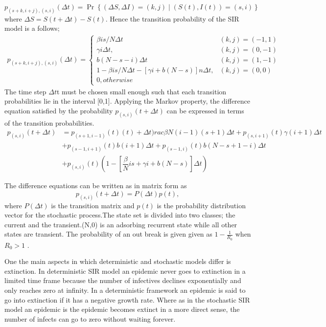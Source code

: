 \begin{equation}
p_{(s+k,i+j),(s,i)}(\Delta t )= \Pr \left\lbrace( \Delta S ,\Delta I) = (k,j)\mid (S(t), I(t)) = (s,i) \right\rbrace
\end{equation}
where $\Delta S = S(t + \Delta t) - S(t)$. Hence the transition probability of the SIR model is a follows;
\begin{align}
p_{(s+k,i+j),(s,i)}(\Delta t )= \left\lbrace \begin{array}{ll}
 \beta i s / N \Delta t & (k,j) = (-1,1)
 \\ \gamma i \Delta t, & (k,j) = (0,-1)
 \\ b (N- s -i)\Delta t & (k,j) = (1,-1)
 \\ 1 - \beta i s/N \Delta t - \left[\gamma i +b(N-s) \right]n\Delta t ,& (k,j) =(0,0)
 \\ 0, otherwise
 \end{array} \right.
\end{align}
The time step $\Delta t$t must be chosen small enough such that each transition probabilities lie in the interval [0,1]. Applying the Markov property, the difference equation satisfied by the probability $p_{(s,i)} (t +\Delta t)$ can be expressed in terms of the transition probabilities.
\begin{align*}
p_{(s,i)} (t + \Delta t) &= p_{(s+1, i-1)}(t) (t) +\Delta t)rac{\beta}{N}(i -1)(s +1) \Delta t + p _{(s,i+1)} (t) \gamma (i +1) \Delta t \\ &+ p_{(s-1,i+1)}(t) b(i+1) \Delta t + p_{(s-1,i)}(t)b(N-s+1- i) \Delta t  \\&
+  {p_(s,i)}(t) \left(1 - \left[\dfrac{\beta}{N} is + \gamma i + b(N-s) \right] \Delta t\right)
\end{align*}

The difference equations can be written as in matrix form as 
\begin{equation*}
p_{(s,i)}(t + \Delta t) = P (\Delta t)p(t),
\end{equation*}
where $P(\Delta t)$ is the transition matrix and $p(t)$ is the probability distribution vector for the stochastic process.The state set is divided into two classes; the current and the transient.(N,0) is an adsorbing recurrent state while all other states are transient. The probability of an out break is given given as $1- \frac{1}{R_0}$ when $R_0 >1$ \citep{Brauer2017}.

One the main aspects in which deterministic and stochastic models differ is extinction. In deterministic SIR model an epidemic never goes to extinction in a limited time frame  because the number of infectives declines exponentially and only reaches zero at infinity.  In a deterministic framework an epidemic is said to go into extinction if it has a negative growth rate. Where as in the stochastic SIR model an epidemic is the  epidemic becomes extinct in a more direct sense, the number of infects can go to zero without waiting forever.